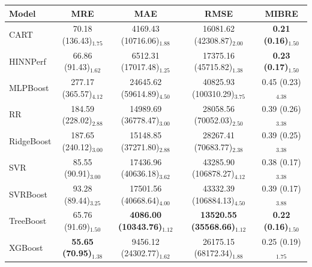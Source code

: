 \begin{tabular}{lcccc}
\toprule
Model & MRE & MAE & RMSE & MIBRE \\
\midrule
CART & 70.18 (136.43)$_{1.75}$ & 4169.43 (10716.06)$_{1.88}$ & 16081.62 (42308.87)$_{2.00}$ & \textbf{0.21 (0.16)$_{1.50}$} \\
HINNPerf & 66.86 (91.43)$_{1.62}$ & 6512.31 (17017.48)$_{1.25}$ & 17375.16 (45715.82)$_{1.38}$ & \textbf{0.23 (0.17)$_{1.50}$} \\
MLPBoost & 277.17 (365.57)$_{4.12}$ & 24645.62 (59614.89)$_{4.50}$ & 40825.93 (100310.29)$_{3.75}$ & 0.45 (0.23)$_{4.38}$ \\
RR & 184.59 (228.02)$_{2.88}$ & 14989.69 (36778.47)$_{3.00}$ & 28058.56 (70052.03)$_{2.50}$ & 0.39 (0.26)$_{3.38}$ \\
RidgeBoost & 187.65 (240.12)$_{3.00}$ & 15148.85 (37271.80)$_{2.88}$ & 28267.41 (70683.77)$_{2.38}$ & 0.39 (0.25)$_{3.38}$ \\
SVR & 85.55 (90.91)$_{3.00}$ & 17436.96 (40636.18)$_{3.62}$ & 43285.90 (106878.27)$_{4.12}$ & 0.38 (0.17)$_{3.38}$ \\
SVRBoost & 93.28 (89.44)$_{3.25}$ & 17501.56 (40668.64)$_{4.00}$ & 43332.39 (106884.13)$_{4.50}$ & 0.39 (0.17)$_{3.88}$ \\
TreeBoost & 65.76 (91.69)$_{1.50}$ & \textbf{4086.00 (10343.76)$_{1.12}$} & \textbf{13520.55 (35568.66)$_{1.12}$} & \textbf{0.22 (0.16)$_{1.50}$} \\
XGBoost & \textbf{55.65 (70.95)$_{1.38}$} & 9456.12 (24302.77)$_{1.62}$ & 26175.15 (68172.34)$_{1.88}$ & 0.25 (0.19)$_{1.75}$ \\
\bottomrule
\end{tabular}

